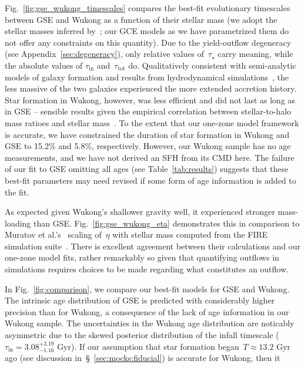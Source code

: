 \documentclass[ms.tex]{subfiles}
\begin{document}
Fig.~\ref{fig:gse_wukong_timescales} compares the best-fit evolutionary
timescales between GSE and Wukong as a function of their stellar mass (we adopt
the stellar masses inferred by~\citealt{Naidu2021, Naidu2022}; our GCE models
as we have parametrized them do not offer any constraints on this quantity).
Due to the yield-outflow degeneracy (see Appendix~\ref{sec:degeneracy}), only
relative values of~$\tau_\star$ carry meaning, while the absolute values of
$\tau_\text{in}$ and~$\tau_\text{tot}$ do.
Qualitatively consistent with semi-analytic models of galaxy formation
\citep[e.g.,][]{Baugh2006, Somerville2015a, Behroozi2019} and results from
hydrodynamical simulations~\citep[e.g.,][]{GarrisonKimmel2019}, the less
massive of the two galaxies experienced the more extended accretion history.
Star formation in Wukong, however, was less efficient and did not last as long
as in GSE -- sensible results given the empirical correlation between
stellar-to-halo mass ratioes and stellar mass~\citep{Hudson2015}.
To the extent that our one-zone model framework is accurate, we have
constrained the duration of star formation in Wukong and GSE to 15.2\% and
5.8\%, respectively.
However, our Wukong sample has no age measurements, and we have not derived
an SFH from its CMD here.
The failure of our fit to GSE omitting all ages (see Table~\ref{tab:results})
suggests that these best-fit parameters may need revised if some form of age
information is added to the fit.
\par
As expected given Wukong's shallower gravity well, it experienced stronger
mass-loading than GSE.
Fig.~\ref{fig:gse_wukong_eta} demonstrates this in comparison to Muratov et
al.'s~\citeyearpar{Muratov2015} scaling of~$\eta$ with stellar mass computed
from the FIRE simulation suite~\citep{Hopkins2014}.
There is excellent agreement between their calculations and our one-zone model
fits, rather remarkably so given that quantifying outflows in simulations
requires choices to be made regarding what constitutes an outflow.
\par
In Fig.~\ref{fig:comparison}, we compare our best-fit models for GSE and Wukong.
The intrinsic age distribution of GSE is predicted with considerably higher
precision than for Wukong, a consequence of the lack of age information in our
Wukong sample.
The uncertainties in the Wukong age distribution are noticably asymmetric due
to the skewed posterior distribution of the infall timescale
($\tau_\text{in} = 3.08^{+3.19}_{-1.16}$ Gyr).
If our assumption that star formation began~$T \approx 13.2$ Gyr ago (see
discussion in~\S~\ref{sec:mocks:fiducial}) is accurate for Wukong, then it
\end{document}
